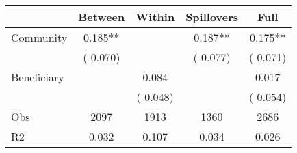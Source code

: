 
\begin{tabular}{l*{4}{c}}\hline&\multicolumn{1}{c}{Between}&\multicolumn{1}{c}{Within}&\multicolumn{1}{c}{Spillovers}&\multicolumn{1}{c}{Full}\\ \hline
 Community             &              0.185**      &                                               &        0.187** &         0.175**                            \\ 
                               &        (       0.070)           &                                       &       (       0.077)     &      (       0.071)                                           \\ 
 Beneficiary   &                                               &        0.084    &                                &             0.017                            \\ 
                               &                                               & (       0.048)                  &                                        &      (       0.054)                                           \\ 
\hline                                                                                                                                                                                                                                            
 Obs                   &               2097               &       1913                       &       1360                &              2686                                               \\ 
 R2                    &                      0.032              &              0.107                      &              0.034               &                     0.026                                              \\ 
\hline \end{tabular}                                                                                                                                                                                                              